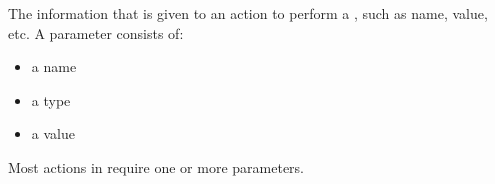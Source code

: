 \item[Parameters]{
The information that is given to an action to perform a \gdstep{}, such as
 name, value, etc.
A parameter consists of:
\begin{itemize}
\item a name
\item a type 
\item a value
\end{itemize}
Most actions in \jb{} require one or more parameters.
}
